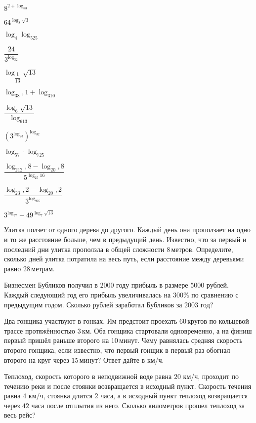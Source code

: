 \begin{class}[number=6]
\begin{listofex}
\begin{enumcols}[itemcolumns=3]
			\item \( 8^{2+\log_83} \)
			\item \( 64^{\log_8\sqrt{3}} \)
			\item \( \log_4\log_525 \)
			\item \( \dfrac{24}{3^{\log_32}} \)
			\item \( \log_{\dfrac{1}{13}}\sqrt{13} \)
			\item \( \log_38,1+\log_310 \)
			\item \( \dfrac{\log_6\sqrt{13}}{\log_613} \)
			\item \( \left( 3^{\log_23} \right)^{\log_32}\)
			\item \( \log_57\cdot\log_725 \)
			\item \( \dfrac{\log_212,8-\log_20,8}{5^{\log_{25}16}} \)
			\item \( \dfrac{\log_23,2-\log_20,2}{3^{\log_925}} \)
			\item \( 3^{\log_37}+49^{\log_7{\sqrt{13}}} \)
		\end{enumcols}
		\item Улитка ползет от одного дерева до другого. Каждый день она проползает на одно и то же расстояние больше, чем в предыдущий день. Известно, что за первый и последний дни улитка проползла в общей сложности \( 8 \) метров. Определите, сколько дней улитка потратила на весь путь, если расстояние между деревьями равно \( 28 \) метрам.
		\item Бизнесмен Бубликов получил в \( 2000 \) году прибыль в размере \( 5000  \) рублей. Каждый следующий год его прибыль увеличивалась на \( 300\% \) по сравнению с предыдущим годом. Сколько рублей заработал Бубликов за \( 2003 \) год?
		\item Два гонщика участвуют в гонках. Им предстоит проехать 60 кругов по кольцевой трассе протяжённостью \( 3 \) км. Оба гонщика стартовали одновременно, а на финиш первый пришёл раньше второго на 10 минут. Чему равнялась средняя скорость второго гонщика, если известно, что первый гонщик в первый раз обогнал второго на круг через \( 15 \) минут? Ответ дайте в км/ч.
		\item Теплоход, скорость которого в неподвижной воде равна \( 20 \) км/ч, проходит по течению реки и после стоянки возвращается в исходный пункт. Скорость течения равна \( 4 \) км/ч, стоянка длится \( 2 \) часа, а в исходный пункт теплоход возвращается через \( 42 \) часа после отплытия из него. Сколько километров прошел теплоход за весь рейс?
	\end{listofex}
\end{class}
